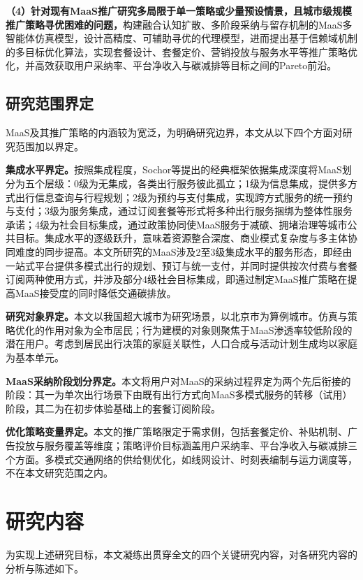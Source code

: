 \textbf{（4）针对现有MaaS推广研究多局限于单一策略或少量预设情景，且城市级规模推广策略寻优困难的问题，}构建融合认知扩散、多阶段采纳与留存机制的MaaS多智能体仿真模型，设计高精度、可辅助寻优的代理模型，进而提出基于信赖域机制的多目标优化算法，实现套餐设计、套餐定价、营销投放与服务水平等推广策略优化，并高效获取用户采纳率、平台净收入与碳减排等目标之间的Pareto前沿。

\subsection{研究范围界定}\label{subsec.intro.scope}

MaaS及其推广策略的内涵较为宽泛，为明确研究边界，本文从以下四个方面对研究范围加以界定。

\textbf{集成水平界定。}按照集成程度，Sochor等提出的经典框架依据集成深度将MaaS划分为五个层级：0级为无集成，各类出行服务彼此孤立；1级为信息集成，提供多方式出行信息查询与行程规划；2级为预约与支付集成，实现跨方式服务的统一预约与支付；3级为服务集成，通过订阅套餐等形式将多种出行服务捆绑为整体性服务承诺；4级为社会目标集成，通过政策协同使MaaS服务于减碳、拥堵治理等城市公共目标\cite{sochorTopologicalApproachMobility2018}。集成水平的逐级跃升，意味着资源整合深度、商业模式复杂度与多主体协同难度的同步提高。本文所研究的MaaS涉及2至3级集成水平的服务形态，即经由一站式平台提供多模式出行的规划、预订与统一支付，并同时提供按次付费与套餐订阅两种使用方式，并涉及部分4级社会目标集成，即通过制定MaaS推广策略在提高MaaS接受度的同时降低交通碳排放。

\textbf{研究对象界定。}本文以我国超大城市为研究场景，以北京市为算例城市。仿真与策略优化的作用对象为全市居民；行为建模的对象则聚焦于MaaS渗透率较低阶段的潜在用户。考虑到居民出行决策的家庭关联性，人口合成与活动计划生成均以家庭为基本单元。

\textbf{MaaS采纳阶段划分界定。}本文将用户对MaaS的采纳过程界定为两个先后衔接的阶段：其一为单次出行场景下由既有出行方式向MaaS多模式服务的转移（试用）阶段，其二为在初步体验基础上的套餐订阅阶段。

\textbf{优化策略变量界定。}本文的推广策略限定于需求侧，包括套餐定价、补贴机制、广告投放与服务覆盖等维度；策略评价目标涵盖用户采纳率、平台净收入与碳减排三个方面。多模式交通网络的供给侧优化，如线网设计、时刻表编制与运力调度等，不在本文研究范围之内。

\section{研究内容}\label{sec.intro.content}

为实现上述研究目标，本文凝练出贯穿全文的四个关键研究内容，对各研究内容的分析与陈述如下。

